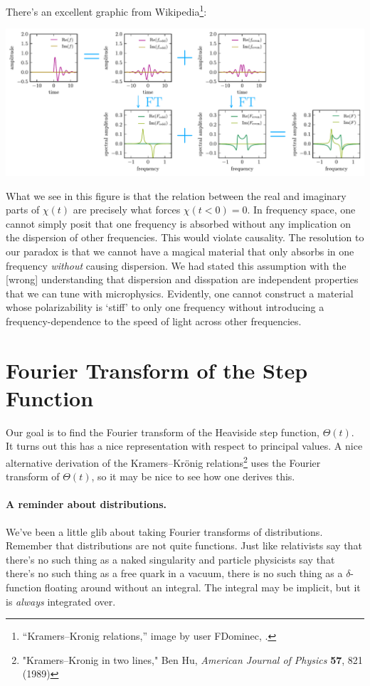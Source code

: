 There's an excellent graphic from Wikipedia\footnote{``Kramers--Kronig relations,'' image by user FDominec, .}:
\begin{center}
\includegraphics[width=.9\textwidth]{figures/Kramers_05_Fdominec.pdf}
\end{center}
What we see in this figure is that the relation between the real and imaginary parts of $\chi(t)$ are precisely what forces $\chi(t<0) = 0$. In frequency space, one cannot simply posit that one frequency is absorbed without any implication on the dispersion of other frequencies. This would violate causality. The resolution to our paradox is that we cannot have a magical material that only absorbs in one frequency \emph{without} causing dispersion. We had stated this assumption with the [wrong] understanding that dispersion and disspation are independent properties that we can tune with microphysics. Evidently, one cannot construct a material whose polarizability is `stiff' to only one frequency without introducing a frequency-dependence to the speed of light across other frequencies.


\section{Fourier Transform of the Step Function}

Our goal is to find the Fourier transform of the Heaviside step function, $\Theta(t)$. It turns out this has a nice representation with respect to principal values. A nice alternative derivation of the Kramers--Kr\"onig relations\footnote{"Kramers–Kronig in two lines," Ben Hu, \emph{American Journal of Physics} \textbf{57}, 821 (1989)} uses the Fourier transform of $\Theta(t)$, so it may be nice to see how one derives this.

\paragraph{A reminder about distributions.}
We've been a little glib about taking Fourier transforms of distributions. Remember that {distributions} are not quite functions. Just like relativists say that there's no such thing as a naked singularity and particle physicists say that there's no such thing as a free quark in a vacuum, there is no such thing as a $\delta$-function floating around without an integral. The integral may be implicit, but it is \emph{always} integrated over. 



